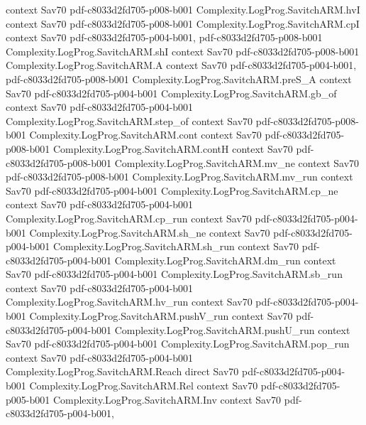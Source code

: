 \begin{theorem}
  {context}
  {Sav70}
  {pdf-c8033d2fd705-p008-b001}
\proofstep
  {Complexity.LogProg.SavitchARM.hvI}
  {context}
  {Sav70}
  {pdf-c8033d2fd705-p008-b001}
\proofstep
  {Complexity.LogProg.SavitchARM.cpI}
  {context}
  {Sav70}
  {pdf-c8033d2fd705-p004-b001,
    pdf-c8033d2fd705-p008-b001}
\proofstep
  {Complexity.LogProg.SavitchARM.shI}
  {context}
  {Sav70}
  {pdf-c8033d2fd705-p008-b001}
\proofstep
  {Complexity.LogProg.SavitchARM.A}
  {context}
  {Sav70}
  {pdf-c8033d2fd705-p004-b001,
    pdf-c8033d2fd705-p008-b001}
\proofstep
  {Complexity.LogProg.SavitchARM.preS_A}
  {context}
  {Sav70}
  {pdf-c8033d2fd705-p004-b001}
\proofstep
  {Complexity.LogProg.SavitchARM.gb_of}
  {context}
  {Sav70}
  {pdf-c8033d2fd705-p004-b001}
\proofstep
  {Complexity.LogProg.SavitchARM.step_of}
  {context}
  {Sav70}
  {pdf-c8033d2fd705-p008-b001}
\proofstep
  {Complexity.LogProg.SavitchARM.cont}
  {context}
  {Sav70}
  {pdf-c8033d2fd705-p008-b001}
\proofstep
  {Complexity.LogProg.SavitchARM.contH}
  {context}
  {Sav70}
  {pdf-c8033d2fd705-p008-b001}
\proofstep
  {Complexity.LogProg.SavitchARM.mv_ne}
  {context}
  {Sav70}
  {pdf-c8033d2fd705-p008-b001}
\proofstep
  {Complexity.LogProg.SavitchARM.mv_run}
  {context}
  {Sav70}
  {pdf-c8033d2fd705-p004-b001}
\proofstep
  {Complexity.LogProg.SavitchARM.cp_ne}
  {context}
  {Sav70}
  {pdf-c8033d2fd705-p004-b001}
\proofstep
  {Complexity.LogProg.SavitchARM.cp_run}
  {context}
  {Sav70}
  {pdf-c8033d2fd705-p004-b001}
\proofstep
  {Complexity.LogProg.SavitchARM.sh_ne}
  {context}
  {Sav70}
  {pdf-c8033d2fd705-p004-b001}
\proofstep
  {Complexity.LogProg.SavitchARM.sh_run}
  {context}
  {Sav70}
  {pdf-c8033d2fd705-p004-b001}
\proofstep
  {Complexity.LogProg.SavitchARM.dm_run}
  {context}
  {Sav70}
  {pdf-c8033d2fd705-p004-b001}
\proofstep
  {Complexity.LogProg.SavitchARM.sb_run}
  {context}
  {Sav70}
  {pdf-c8033d2fd705-p004-b001}
\proofstep
  {Complexity.LogProg.SavitchARM.hv_run}
  {context}
  {Sav70}
  {pdf-c8033d2fd705-p004-b001}
\proofstep
  {Complexity.LogProg.SavitchARM.pushV_run}
  {context}
  {Sav70}
  {pdf-c8033d2fd705-p004-b001}
\proofstep
  {Complexity.LogProg.SavitchARM.pushU_run}
  {context}
  {Sav70}
  {pdf-c8033d2fd705-p004-b001}
\proofstep
  {Complexity.LogProg.SavitchARM.pop_run}
  {context}
  {Sav70}
  {pdf-c8033d2fd705-p004-b001}
\proofstep
  {Complexity.LogProg.SavitchARM.Reach}
  {direct}
  {Sav70}
  {pdf-c8033d2fd705-p004-b001}
\proofstep
  {Complexity.LogProg.SavitchARM.Rel}
  {context}
  {Sav70}
  {pdf-c8033d2fd705-p005-b001}
\proofstep
  {Complexity.LogProg.SavitchARM.Inv}
  {context}
  {Sav70}
  {pdf-c8033d2fd705-p004-b001,
}
\end{theorem}
